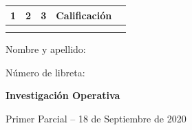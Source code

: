 \documentclass[a4paper,oneside,12pt]{amsart}
\newcommand{\nombremateria}
{Investigaci\'on Operativa}
\newcommand{\numeroparcial}
    { Primer Parcial }
\newcommand{\fecha}
    {18 de Septiembre de 2020}
\begin{document}
\hfill \hfill
\begin{tabular}[c]{|c|c|c|c|c|}
\hline 
1 & 2 & 3 &  Calificaci\'on \\ \hline \hline
\hspace{1.2 cm} & \hspace{1.2 cm} & \hspace{1.2 cm} & \hspace{1.5 cm} \\
\hspace{1.2 cm} & \hspace{1.2 cm} & \hspace{1.2 cm} & \hspace{1.5 cm} \\ \hline

\end{tabular}

\vspace{-1cm}

\noindent Nombre y apellido:

\vspace{0.2cm}

\noindent Número de libreta:

\noindent \hrulefill 

\smallskip
\renewcommand{\baselinestretch}{1.1}

\begin{center}
	\large \textbf{\nombremateria} 
	
	\numeroparcial -- \fecha
\end{center}

\vspace{.6cm}
\renewcommand{\theenumi}{\textbf{\arabic{enumi}}}

\end{document}
